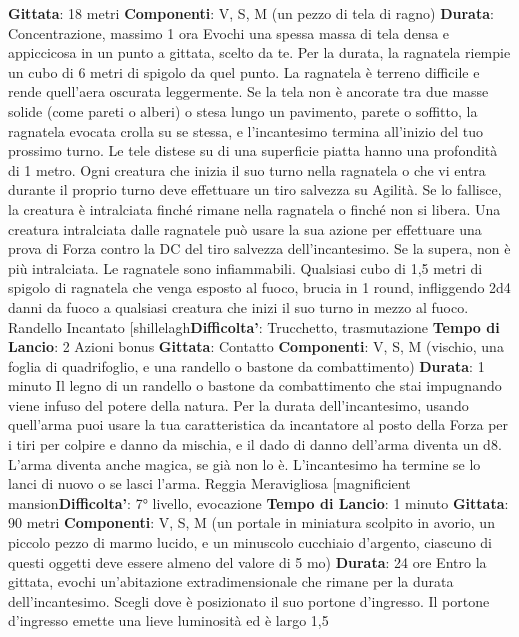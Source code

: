 \begin{multicols}{2}
\textbf{Gittata}: 18 metri
\textbf{Componenti}: V, S, M (un pezzo di tela di ragno)
\textbf{Durata}: Concentrazione, massimo 1 ora
Evochi una spessa massa di tela densa e appiccicosa
in un punto a gittata, scelto da te. Per la durata, la
ragnatela riempie un cubo di 6 metri di spigolo da quel
punto. La ragnatela è terreno difficile e rende quell’aera
oscurata leggermente.
Se la tela non è ancorate tra due masse solide (come
pareti o alberi) o stesa lungo un pavimento, parete o
soffitto, la ragnatela evocata crolla su se stessa, e
l’incantesimo termina all’inizio del tuo prossimo turno.
Le tele distese su di una superficie piatta hanno una
profondità di 1 metro.
Ogni creatura che inizia il suo turno nella ragnatela o
che vi entra durante il proprio turno deve effettuare un
tiro salvezza su Agilità. Se lo fallisce, la creatura è
intralciata finché rimane nella ragnatela o finché non si
libera.
Una creatura intralciata dalle ragnatele può usare la
sua azione per effettuare una prova di Forza contro la
DC del tiro salvezza dell’incantesimo. Se la supera, non
è più intralciata.
Le ragnatele sono infiammabili. Qualsiasi cubo di 1,5
metri di spigolo di ragnatela che venga esposto al
fuoco, brucia in 1 round, infliggendo 2d4 danni da fuoco
a qualsiasi creatura che inizi il suo turno in mezzo al
fuoco.
Randello Incantato
[shillelagh\textbf{Difficolta'}:
Trucchetto, trasmutazione
\textbf{Tempo di Lancio}: 2 Azioni bonus
\textbf{Gittata}: Contatto
\textbf{Componenti}: V, S, M (vischio, una foglia di
quadrifoglio, e una randello o bastone da
combattimento)
\textbf{Durata}: 1 minuto
Il legno di un randello o bastone da combattimento che
stai impugnando viene infuso del potere della natura.
Per la durata dell’incantesimo, usando quell’arma puoi
usare la tua caratteristica da incantatore al posto della
Forza per i tiri per colpire e danno da mischia, e il dado
di danno dell’arma diventa un d8. L’arma diventa anche
magica, se già non lo è. L’incantesimo ha termine se lo
lanci di nuovo o se lasci l’arma.
Reggia Meravigliosa
[magnificient mansion\textbf{Difficolta'}:
7° livello, evocazione
\textbf{Tempo di Lancio}: 1 minuto
\textbf{Gittata}: 90 metri
\textbf{Componenti}: V, S, M (un portale in miniatura scolpito
in avorio, un piccolo pezzo di marmo lucido, e un
minuscolo cucchiaio d’argento, ciascuno di questi
oggetti deve essere almeno del valore di 5 mo)
\textbf{Durata}: 24 ore
Entro la gittata, evochi un’abitazione extradimensionale
che rimane per la durata dell’incantesimo. Scegli dove è
posizionato il suo portone d’ingresso. Il portone
d’ingresso emette una lieve luminosità ed è largo 1,5

\end{multicols}
